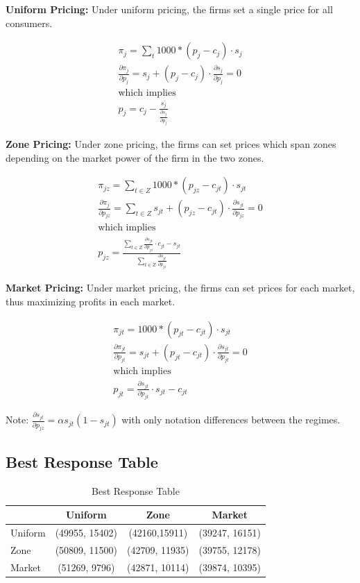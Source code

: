 \documentclass[11pt]{article}
\theoremstyle{definition}
\theoremstyle{remark}
\begin{document}
\textbf{Uniform Pricing:} Under uniform pricing, the firms set a single price for all consumers.

\begin{gather*}
  \pi_j = \sum_t 1000*(p_j - c_j) \cdot s_j \\
  \frac{\partial \pi_j}{\partial p_j} = s_j + (p_j - c_j) \cdot \frac{\partial s_j}{\partial p_j} = 0 \\
  \text{which implies} \\
  p_j = c_j - \frac{s_j}{\frac{\partial s_j}{\partial p_j}}
\end{gather*}

\textbf{Zone Pricing:} Under zone pricing, the firms can set prices which span zones depending on the market power of the firm in the two zones.

\begin{gather*}
  \pi_{jz} = \sum_{t\in Z} 1000*(p_{jz} - c_{jt}) \cdot s_{jt} \\
  \frac{\partial \pi_j}{\partial p_{jz}} = \sum_{t\in Z} s_{jt} + (p_{jz} - c_{jt}) \cdot \frac{\partial s_{jt}}{\partial p_{jz}} = 0 \\
  \text{which implies} \\
  p_{jz} = \frac{\sum_{t\in Z} \frac{\partial s_{jt}}{\partial p_{jz}} \cdot c_{jt} - s_{jt}}{\sum_{t\in Z} \frac{\partial s_{jt}}{\partial p_{jz}}}
\end{gather*}

\textbf{Market Pricing:} Under market pricing, the firms can set prices for each market, thus maximizing profits in each market.

\begin{gather*}
  \pi_{jt} = 1000*(p_{jt} - c_{jt}) \cdot s_{jt} \\
  \frac{\partial \pi_{jt}}{\partial p_{jt}} = s_{jt} + (p_{jt} - c_{jt}) \cdot \frac{\partial s_{jt}}{\partial p_{jt}} = 0 \\
  \text{which implies} \\
  p_{jt} = \frac{\partial s_{jt}}{\partial p_{jt}} \cdot s_{jt} - c_{jt}
\end{gather*}

Note: $\frac{\partial s_{jt}}{\partial p_{jz}} = \alpha s_{jt}(1-s_{jt})$ with only notation differences between the regimes.

\subsection{Best Response Table}
\begin{table}
\centering
\begin{tabular}{lccc}
\toprule
  & Uniform & Zone & Market\\
\midrule
  Uniform & (49955, 15402) & (42160,15911) & (39247, 16151) \\
  Zone & (50809, 11500) & (42709, 11935) & (39755, 12178) \\
  Market & (51269, 9796) & (42871, 10114) & (39874, 10395) \\
\bottomrule
\end{tabular}
\caption{Best Response Table}
\end{table}
\end{document}
